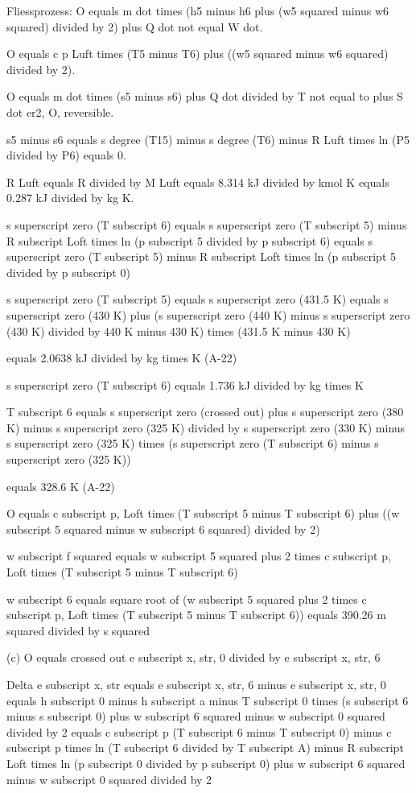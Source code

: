 Fliessprozess:
O equals m dot times (h5 minus h6 plus (w5 squared minus w6 squared) divided by 2) plus Q dot not equal W dot.

O equals c p Luft times (T5 minus T6) plus ((w5 squared minus w6 squared) divided by 2).

O equals m dot times (s5 minus s6) plus Q dot divided by T not equal to plus S dot er2, O, reversible.

s5 minus s6 equals s degree (T15) minus s degree (T6) minus R Luft times ln (P5 divided by P6) equals 0.

R Luft equals R divided by M Luft equals 8.314 kJ divided by kmol K equals 0.287 kJ divided by kg K.

s superscript zero (T subscript 6) equals s superscript zero (T subscript 5) minus R subscript Loft times ln (p subscript 5 divided by p subscript 6) equals s superscript zero (T subscript 5) minus R subscript Loft times ln (p subscript 5 divided by p subscript 0)

s superscript zero (T subscript 5) equals s superscript zero (431.5 K) equals s superscript zero (430 K) plus (s superscript zero (440 K) minus s superscript zero (430 K) divided by 440 K minus 430 K) times (431.5 K minus 430 K)

equals 2.0638 kJ divided by kg times K (A-22)

s superscript zero (T subscript 6) equals 1.736 kJ divided by kg times K

T subscript 6 equals s superscript zero (crossed out) plus s superscript zero (380 K) minus s superscript zero (325 K) divided by s superscript zero (330 K) minus s superscript zero (325 K) times (s superscript zero (T subscript 6) minus s superscript zero (325 K))

equals 328.6 K (A-22)

O equals c subscript p, Loft times (T subscript 5 minus T subscript 6) plus ((w subscript 5 squared minus w subscript 6 squared) divided by 2)

w subscript f squared equals w subscript 5 squared plus 2 times c subscript p, Loft times (T subscript 5 minus T subscript 6)

w subscript 6 equals square root of (w subscript 5 squared plus 2 times c subscript p, Loft times (T subscript 5 minus T subscript 6)) equals 390.26 m squared divided by s squared

(c) O equals crossed out e subscript x, str, 0 divided by e subscript x, str, 6

Delta e subscript x, str equals e subscript x, str, 6 minus e subscript x, str, 0 equals h subscript 0 minus h subscript a minus T subscript 0 times (s subscript 6 minus s subscript 0) plus w subscript 6 squared minus w subscript 0 squared divided by 2 equals c subscript p (T subscript 6 minus T subscript 0) minus c subscript p times ln (T subscript 6 divided by T subscript A) minus R subscript Loft times ln (p subscript 0 divided by p subscript 0) plus w subscript 6 squared minus w subscript 0 squared divided by 2

